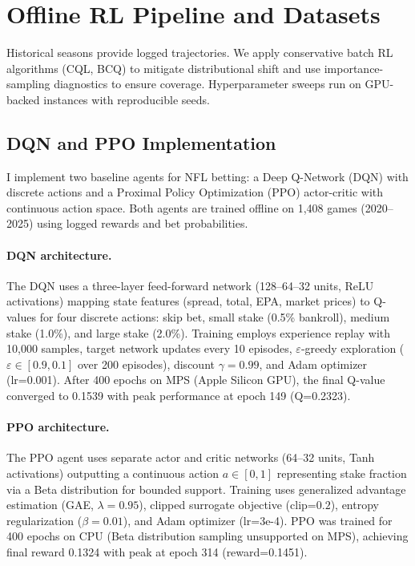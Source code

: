 \section{Offline RL Pipeline and Datasets}
Historical seasons provide logged trajectories. We apply conservative batch RL algorithms (CQL, BCQ) to mitigate distributional shift and use importance-sampling diagnostics to ensure coverage. Hyperparameter sweeps run on GPU-backed instances with reproducible seeds.

\subsection{DQN and PPO Implementation}\label{subsec:dqn-ppo-impl}
I implement two baseline agents for NFL betting: a Deep Q-Network (DQN) with discrete actions and a Proximal Policy Optimization (PPO) actor-critic with continuous action space. Both agents are trained offline on 1,408 games (2020--2025) using logged rewards and bet probabilities.

\paragraph{DQN architecture.} The DQN uses a three-layer feed-forward network (128–64–32 units, ReLU activations) mapping state features (spread, total, EPA, market prices) to Q-values for four discrete actions: skip bet, small stake (0.5\% bankroll), medium stake (1.0\%), and large stake (2.0\%). Training employs experience replay with 10,000 samples, target network updates every 10 episodes, $\varepsilon$-greedy exploration ($\varepsilon\in[0.9,0.1]$ over 200 episodes), discount $\gamma=0.99$, and Adam optimizer (lr=0.001). After 400 epochs on MPS (Apple Silicon GPU), the final Q-value converged to 0.1539 with peak performance at epoch 149 (Q=0.2323).

\paragraph{PPO architecture.} The PPO agent uses separate actor and critic networks (64–32 units, Tanh activations) outputting a continuous action $a\in[0,1]$ representing stake fraction via a Beta distribution for bounded support. Training uses generalized advantage estimation (GAE, $\lambda=0.95$), clipped surrogate objective (clip=$0.2$), entropy regularization ($\beta=0.01$), and Adam optimizer (lr=3e-4). PPO was trained for 400 epochs on CPU (Beta distribution sampling unsupported on MPS), achieving final reward 0.1324 with peak at epoch 314 (reward=0.1451).

